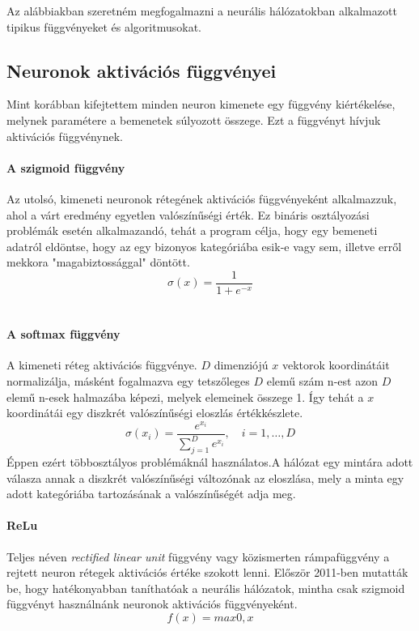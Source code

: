 Az alábbiakban szeretném megfogalmazni a neurális hálózatokban alkalmazott tipikus függvényeket és algoritmusokat.
\subsection{Neuronok aktivációs függvényei}
Mint korábban kifejtettem minden neuron kimenete egy függvény kiértékelése, melynek paramétere a bemenetek súlyozott összege. Ezt a függvényt hívjuk aktivációs függvénynek. 

\paragraph{A szigmoid függvény}
Az utolsó, kimeneti neuronok rétegének aktivációs függvényeként alkalmazzuk, ahol a várt eredmény egyetlen valószínűségi érték. Ez bináris osztályozási problémák esetén alkalmazandó, tehát a program célja, hogy egy bemeneti adatról eldöntse, hogy az egy bizonyos kategóriába esik-e vagy sem, illetve erről mekkora "magabiztossággal" döntött.
\begin{equation}
	\sigma(x)= \frac{1}{1+e^{-x}}
	\label{eq:sigmoid}
\end{equation}\

\paragraph{A softmax függvény}
A kimeneti réteg aktivációs függvénye. $D$ dimenziójú $x$ vektorok koordinátáit normalizálja, másként fogalmazva egy tetszőleges $D$ elemű szám n-est azon $D$ elemű n-esek halmazába képezi, melyek elemeinek összege 1. Így tehát a $x$ koordinátái egy diszkrét valószínűségi eloszlás értékkészlete. 
\begin{equation}
\sigma(x_i)=\frac{e^{x_i}}{\sum_{j=1}^{D}e^{x_i}},\quad i = 1,\dots,D
\label{eq:softmax}
\end{equation}
Éppen ezért többosztályos problémáknál használatos.A hálózat egy mintára adott válasza annak a diszkrét valószínűségi változónak az eloszlása, mely a minta egy adott kategóriába tartozásának a valószínűségét adja meg.

\paragraph{ReLu}
Teljes néven \emph{rectified linear unit} függvény vagy közismerten rámpafüggvény a rejtett neuron rétegek aktivációs értéke szokott lenni. Először 2011-ben mutatták be, hogy hatékonyabban taníthatóak a neurális hálózatok, mintha csak szigmoid függvényt használnánk neuronok aktivációs függvényeként.\cite{wiki:relu}
\begin{equation}
	f(x) = max{0,x}
	\label{eq:relu}
\end{equation}

